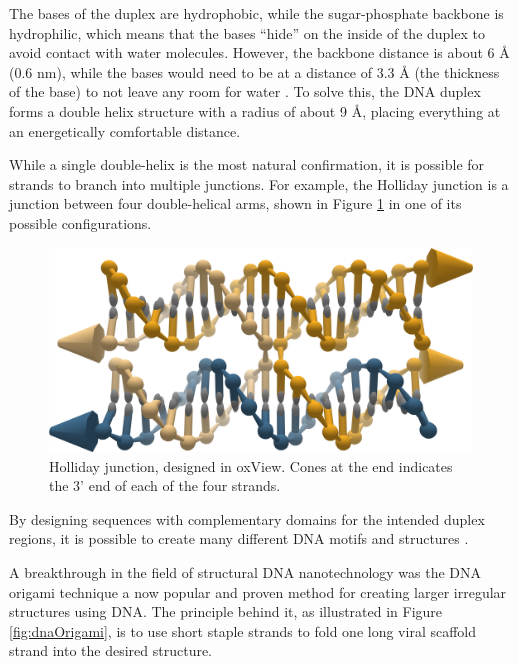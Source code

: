 The bases of the duplex are hydrophobic, while the sugar-phosphate backbone is hydrophilic, which means that the bases ``hide'' on the inside of the duplex to avoid contact with water molecules. However, the backbone distance is about 6 Å (0.6 nm), while the bases would need to be at a distance of 3.3 Å (the thickness of the base) to not leave any room for water \cite{calladine1997understanding}. To solve this, the DNA duplex forms a double helix structure with a radius of about 9 Å, placing everything at an energetically comfortable distance.

While a single double-helix is the most natural confirmation, it is possible for strands to branch into multiple junctions. For example, the Holliday junction is a junction between four double-helical arms, shown in Figure \ref{fig:holliday} in one of its possible configurations.

\begin{figure}
    \centering\includegraphics[width=\textwidth]{figures/holliday.png}
    \caption{Holliday junction, designed in oxView. Cones at the end indicates the 3' end of each of the four strands.}
    \label{fig:holliday}
\end{figure}



By designing sequences with complementary domains for the intended duplex regions, it is possible to create many different DNA motifs and structures \cite{seeman_2016}.


A breakthrough in the field of structural DNA nanotechnology was the DNA origami technique \cite{rothemund2006folding} a now popular and proven method for creating larger irregular structures using DNA. The principle behind it, as illustrated in Figure \ref{fig:dnaOrigami}, is to use short staple strands to fold one long viral scaffold strand into the desired structure.

